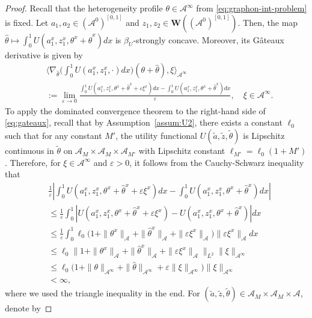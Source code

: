 \documentclass[11pt]{article}
\def\eps{\varepsilon}
\newcommand{\be}{\begin{equation}}
\newcommand{\ee}{\end{equation}}
\numberwithin{equation}{section}
\begin{document}
\begin{proof}%
Recall that the heterogeneity profile $\theta\in\mathcal{A}^\infty$ from \eqref{eq:graphon-int-problem} is fixed.
Let $a_1,a_2\in(\mathcal{A}^0)^{[0,1]}$ and $z_1,z_2\in\boldsymbol{W}((\mathcal{A}^0)^{[0,1]})$. Then, the map $\hat\theta\mapsto\int_0^1 U(a_1^x,z_1^x,\theta^x+\hat\theta^x)dx$ is $\beta_U$-strongly concave. Moreover, its G\^ateaux derivative is given by
\be\begin{aligned}\label{eq:gateaux}
&\langle\nabla_{\hat\theta}\big( \int_0^1U(a_1^x,z_1^x,\cdot)dx\big)({\theta}+\hat\theta),\xi\rangle_{\mathcal{A}^\infty}\\
&:=\lim_{\eps\to 0}\frac{\int_0^1U(a_1^x,z_1^x,\theta^x+\hat\theta^x+\eps\xi^x)dx-\int_0^1U(a_1^x,z_1^x,\theta^x+\hat\theta^x)dx}{\eps},\quad \xi\in\mathcal{A}^\infty.
\end{aligned}\ee
To apply the dominated convergence theorem to the right-hand side of \eqref{eq:gateaux}, recall that by Assumption~\ref{assum:U2}, there exists a constant $\ell_0$  such that for any constant $M'$, the utility functional $U(\tilde a,\tilde z,\tilde \theta)$ is Lipschitz continuous in $\tilde\theta$ on $\mathcal{A}_M\times \mathcal{A}_M\times\mathcal{A}_{M'}$ with Lipschitz constant $\ell_{M'}=\ell_0(1+M')$. Therefore, for $\xi\in\mathcal{A}^\infty$ and $\eps>0$, it follows from the Cauchy-Schwarz inequality that
\be\begin{aligned}\label{eq:DCT}
&\frac{1}{\eps}\left| \int_0^1U(a_1^x,z_1^x,\theta^x+\hat\theta^x+\eps\xi^x)dx-\int_0^1U(a_1^x,z_1^x,\theta^x+\hat\theta^x)dx \right|\\
&\leq \frac{1}{\eps}\int_0^1\left|U(a_1^x,z_1^x,\theta^x+\hat\theta^x+\eps\xi^x)-U(a_1^x,z_1^x,\theta^x+\hat\theta^x)\right|dx \\
&\leq \frac{1}{\eps}\int_0^1 \ell_0\big(1+\|\theta^x\|_{\mathcal{A}}+\|\hat\theta^x\|_{\mathcal{A}}+\|\eps\xi^x\|_{\mathcal{A}}\big)\|\eps\xi^x\|_{\mathcal{A}}dx\\
&\leq \ell_0\big\|1+\|\theta^x\|_{\mathcal{A}}+\|\hat\theta^x\|_{\mathcal{A}}+\|\eps\xi^x\|_{\mathcal{A}}\big\|_{L^2}\|\xi\|_{\mathcal{A}^\infty}\\
&\leq \ell_0\big(1+\|\theta\|_{\mathcal{A}^\infty}+\|\hat\theta\|_{\mathcal{A}^\infty}+\eps\|\xi\|_{\mathcal{A}^\infty}\big)\|\xi\|_{\mathcal{A}^\infty}\\
&<\infty,
\end{aligned}\ee
where we used the triangle inequality in the end. For $(\tilde a,\tilde z,\tilde \theta)\in\mathcal{A}_M\times\mathcal{A}_M\times\mathcal{A}$, denote by 

\end{proof}
\end{document}

